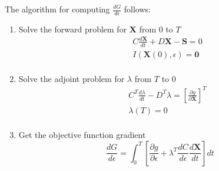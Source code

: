 \documentclass{tufte-handout}
\begin{document}
The algorithm for computing $ \frac{d G}{d\epsilon}$ follows:
\begin{enumerate}
	\item Solve the forward problem for $\mathbf{X}$ from $0$ to $T$
	\begin{equation*}
	\begin{aligned}
 \quad & C \frac{d \mathbf{X}}{dt} + D \mathbf{X} - \mathbf{S} = 0\\
	&I(\mathbf{X}(0),\epsilon) = \mathbf{0}   \\
	\end{aligned}
	\end{equation*}
	\item Solve the adjoint problem for $\lambda$ from $T$ to $0$
	\begin{equation*}
	\begin{aligned}
	\quad & C^T \frac{d \lambda }{dt} - D^T \lambda = \left[ \frac{\partial g}{\partial \mathbf{X}}\right]^T \\
	&\lambda(T) = 0   \\
	\end{aligned}
	\end{equation*}
	\item Get the objective function gradient
	  \begin{equation*}\label{lag_graddd}
	  \frac{d G}{d\epsilon} = \int_{0}^{T} \left[  \frac{\partial g}{\partial \epsilon} + \lambda^T \frac{d C}{d \epsilon} \frac{d \mathbf{X}}{dt}  \right] dt 
	  \end{equation*}
\end{enumerate}
\end{document}
